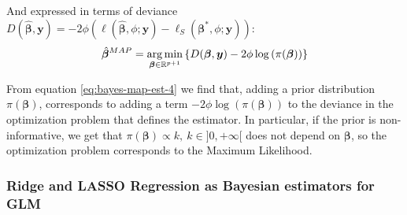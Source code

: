 \documentclass[a4paper, nobind]{templates/ociamthesis}
\theoremstyle{definition}
\theoremstyle{definition}
\theoremstyle{definition}
\theoremstyle{remark}
\begin{document}
And expressed in terms of deviance \(D(\hat{\boldsymbol{\beta}}, \boldsymbol{y}) = -2\phi\left(\ell\left(\hat{\boldsymbol{\beta}}, \phi; \boldsymbol{y}\right) - \ell_{S}\left(\boldsymbol{\beta}^*, \phi; \boldsymbol{y}\right)\right)\):
\begin{equation}
\label{eq:bayes-map-est-4}
\hat{\boldsymbol{\beta}}^{MAP} =
\operatorname*{arg\,min}_{\boldsymbol{\beta}\in\mathbb{R}^{p+1}}{\left\{
D(\boldsymbol{\beta}, \boldsymbol{y}) -2\phi \log{\left(\pi(\boldsymbol{\beta})\right)} \right\}}
\end{equation}

From equation \eqref{eq:bayes-map-est-4} we find that, adding a prior distribution \(\pi(\boldsymbol{\beta})\), corresponds to adding a term \(-2\phi \log{\left(\pi(\boldsymbol{\beta})\right)}\) to the deviance in the optimization problem that defines the estimator. In particular, if the prior is non-informative, we get that \(\pi(\boldsymbol{\beta})\propto k, \ k\in]0,+\infty[\) does not depend on \(\boldsymbol{\beta}\), so the optimization problem corresponds to the Maximum Likelihood.

\hypertarget{chap:bayes-ridge-lasso}{%
\subsubsection{Ridge and LASSO Regression as Bayesian estimators for GLM}\label{chap:bayes-ridge-lasso}}
\end{document}
